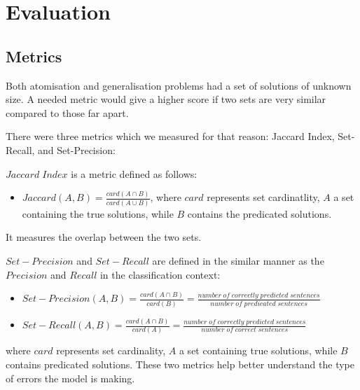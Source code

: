 \section{Evaluation}

\subsection{Metrics}



Both atomisation and generalisation problems had a set of solutions of unknown size.
A needed metric would give a higher score if two sets are very similar compared to those far apart.

There were three metrics which we measured for that reason: Jaccard Index, Set-Recall, and Set-Precision:

$Jaccard \; Index$ is a metric defined as follows:
\begin{itemize}
   \item $Jaccard(A, B) = \frac{card(A \cap B)}{card(A \cup B)}$, where $card$ represents set cardinatlity, $A$ a set containing the true solutions, while $B$ contains the predicated solutions.\\
\end{itemize}
It measures the overlap between the two sets.
 
$Set-Precision$ and $Set-Recall$ are defined in the similar manner as the $Precision$ and $Recall$ in the classification context:
\begin{itemize}
    \item $Set-Precision(A, B) = \frac{card(A \cap B)}{card(B)} = \frac{number \; of \; correctly \; predicted \; sentences}{number \; of \; predicated \; sentences}$
    \item $Set-Recall(A, B) = \frac{card(A \cap B)}{card(A)} = \frac{number \; of \; correctly \; predicted \; sentences}{number \; of \; correct \; sentences} $ 
\end{itemize}
where $card$ represents set cardinality, $A$ a set containing true solutions, while $B$ contains predicated solutions. 
These two metrics help better understand the type of errors the model is making.


% 
% 
% 
% 


